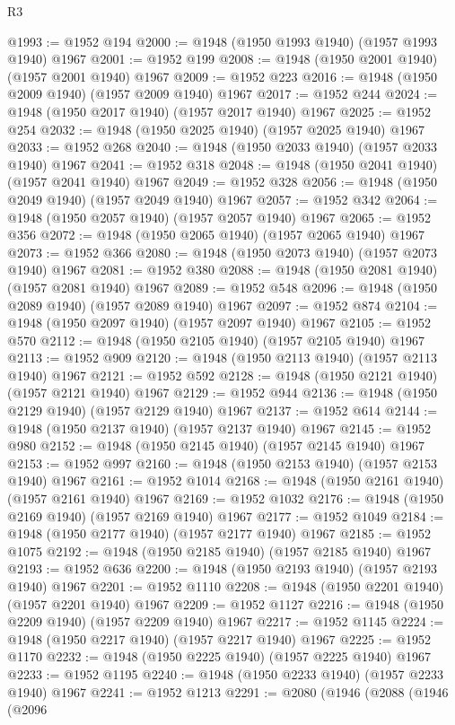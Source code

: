 \begin{lexlean}{R3}
\begin{coremodule}
@1993 := @1952 @194
@2000 := @1948 (@1950 @1993 @1940) (@1957 @1993 @1940) @1967
@2001 := @1952 @199
@2008 := @1948 (@1950 @2001 @1940) (@1957 @2001 @1940) @1967
@2009 := @1952 @223
@2016 := @1948 (@1950 @2009 @1940) (@1957 @2009 @1940) @1967
@2017 := @1952 @244
@2024 := @1948 (@1950 @2017 @1940) (@1957 @2017 @1940) @1967
@2025 := @1952 @254
@2032 := @1948 (@1950 @2025 @1940) (@1957 @2025 @1940) @1967
@2033 := @1952 @268
@2040 := @1948 (@1950 @2033 @1940) (@1957 @2033 @1940) @1967
@2041 := @1952 @318
@2048 := @1948 (@1950 @2041 @1940) (@1957 @2041 @1940) @1967
@2049 := @1952 @328
@2056 := @1948 (@1950 @2049 @1940) (@1957 @2049 @1940) @1967
@2057 := @1952 @342
@2064 := @1948 (@1950 @2057 @1940) (@1957 @2057 @1940) @1967
@2065 := @1952 @356
@2072 := @1948 (@1950 @2065 @1940) (@1957 @2065 @1940) @1967
@2073 := @1952 @366
@2080 := @1948 (@1950 @2073 @1940) (@1957 @2073 @1940) @1967
@2081 := @1952 @380
@2088 := @1948 (@1950 @2081 @1940) (@1957 @2081 @1940) @1967
@2089 := @1952 @548
@2096 := @1948 (@1950 @2089 @1940) (@1957 @2089 @1940) @1967
@2097 := @1952 @874
@2104 := @1948 (@1950 @2097 @1940) (@1957 @2097 @1940) @1967
@2105 := @1952 @570
@2112 := @1948 (@1950 @2105 @1940) (@1957 @2105 @1940) @1967
@2113 := @1952 @909
@2120 := @1948 (@1950 @2113 @1940) (@1957 @2113 @1940) @1967
@2121 := @1952 @592
@2128 := @1948 (@1950 @2121 @1940) (@1957 @2121 @1940) @1967
@2129 := @1952 @944
@2136 := @1948 (@1950 @2129 @1940) (@1957 @2129 @1940) @1967
@2137 := @1952 @614
@2144 := @1948 (@1950 @2137 @1940) (@1957 @2137 @1940) @1967
@2145 := @1952 @980
@2152 := @1948 (@1950 @2145 @1940) (@1957 @2145 @1940) @1967
@2153 := @1952 @997
@2160 := @1948 (@1950 @2153 @1940) (@1957 @2153 @1940) @1967
@2161 := @1952 @1014
@2168 := @1948 (@1950 @2161 @1940) (@1957 @2161 @1940) @1967
@2169 := @1952 @1032
@2176 := @1948 (@1950 @2169 @1940) (@1957 @2169 @1940) @1967
@2177 := @1952 @1049
@2184 := @1948 (@1950 @2177 @1940) (@1957 @2177 @1940) @1967
@2185 := @1952 @1075
@2192 := @1948 (@1950 @2185 @1940) (@1957 @2185 @1940) @1967
@2193 := @1952 @636
@2200 := @1948 (@1950 @2193 @1940) (@1957 @2193 @1940) @1967
@2201 := @1952 @1110
@2208 := @1948 (@1950 @2201 @1940) (@1957 @2201 @1940) @1967
@2209 := @1952 @1127
@2216 := @1948 (@1950 @2209 @1940) (@1957 @2209 @1940) @1967
@2217 := @1952 @1145
@2224 := @1948 (@1950 @2217 @1940) (@1957 @2217 @1940) @1967
@2225 := @1952 @1170
@2232 := @1948 (@1950 @2225 @1940) (@1957 @2225 @1940) @1967
@2233 := @1952 @1195
@2240 := @1948 (@1950 @2233 @1940) (@1957 @2233 @1940) @1967
@2241 := @1952 @1213
@2291 := @2080
    (@1946
      (@2088
        (@1946
          (@2096

\end{coremodule}
\end{lexlean}
